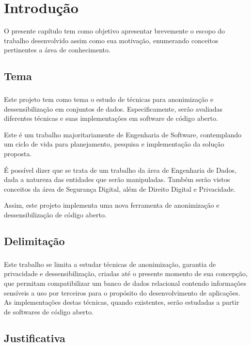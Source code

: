 \chapter{Introdução}
\label{cap1}

O presente capítulo tem como objetivo apresentar brevemente o escopo do trabalho desenvolvido assim como sua motivação, enumerando conceitos pertinentes a área de conhecimento.

\section{Tema}

\paragraph{} Este projeto tem como tema o estudo de técnicas para anonimização e dessensibilização em conjuntos de dados. Especificamente, serão avaliadas diferentes técnicas e suas implementações em software de código aberto.

Este é um trabalho majoritariamente de Engenharia de Software, contemplando um ciclo de vida para planejamento, pesquisa e implementação da solução proposta.

É possível dizer que se trata de um trabalho da área de Engenharia de Dados, dada a natureza das entidades que serão manipuladas. Também serão vistos conceitos da área de Segurança Digital, além de Direito Digital e Privacidade.

Assim, este projeto implementa uma nova ferramenta de anonimização e dessensibilização de código aberto.


\section{Delimitação}

\paragraph{} Este trabalho se limita a estudar técnicas de anonimização, garantia de privacidade e dessensibilização, criadas até o presente momento de sua concepção, que permitam compatibilizar um banco de dados relacional contendo informações sensíveis a uso por terceiros para o propósito do desenvolvimento de aplicações. As implementações destas técnicas, quando existentes, serão estudadas a partir de softwares de código aberto.

\section{Justificativa}

